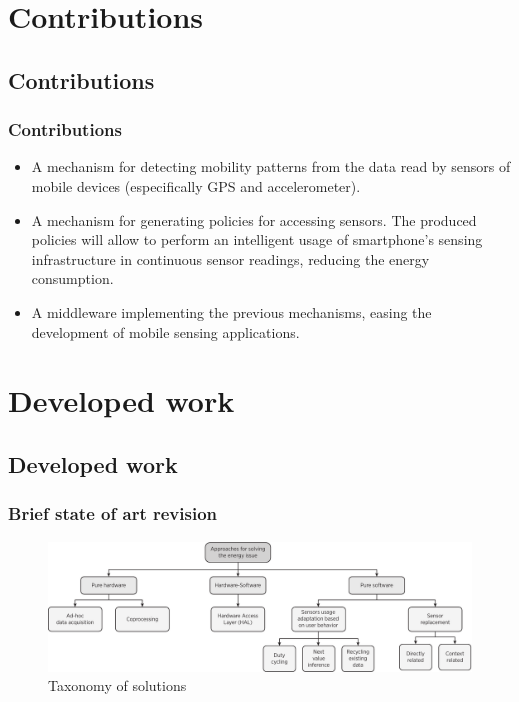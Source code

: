 \documentclass[compress,9pt,xcolor={dvipsnames,table}]{beamer}
\begin{document}
\section{Contributions}
\subsection{Contributions}
\begin{frame}\frametitle{Contributions}
\begin{itemize}
  \item A mechanism for detecting mobility patterns from the data read by sensors of mobile devices (especifically GPS and accelerometer).
  \item A mechanism for generating policies for accessing sensors.
  The produced policies will allow to perform an intelligent usage of smartphone's sensing infrastructure in continuous sensor readings, reducing the energy consumption.
  \item A middleware implementing the previous mechanisms, easing the development of mobile sensing applications.
\end{itemize}
\end{frame}


\section{Developed work}
\subsection{Developed work}
\begin{frame}\frametitle{Brief state of art revision}
\begin{figure}[tb]
  \centering
  \includegraphics[width=\textwidth]{../../../resources/images/vectors/approaches-taxonomy}
  \caption{Taxonomy of solutions}
  \label{fig:taxonomy}
\end{figure}
\end{frame}
\end{document}
